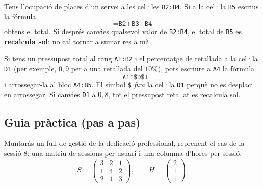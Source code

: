 \begin{exemple}
Tens l'ocupació de places d'un servei a les cel·les \texttt{B2:B4}. Si a la cel·la
\texttt{B5} escrius la fórmula
\[
\texttt{=B2+B3+B4}
\]
obtens el total. Si després canvies qualsevol valor de \texttt{B2:B4}, el total de
\texttt{B5} es \textbf{recalcula sol}: no cal tornar a sumar res a mà.
\end{exemple}

\begin{exemple}
Si tens un pressupost total al rang \texttt{A1:B2} i el percentatge de retallada a
la cel·la \texttt{D1} (per exemple, $0{,}9$ per a una retallada del $10\%$), pots
escriure a \texttt{A4} la fórmula
\[
\texttt{=A1*\$D\$1}
\]
i arrossegar-la al bloc \texttt{A4:B5}. El símbol \texttt{\$} \emph{fixa} la cel·la
\texttt{D1} perquè no es desplaci en arrossegar. Si canvies \texttt{D1} a $0{,}8$,
tot el pressupost retallat es recalcula sol.
\end{exemple}

\subsection{Guia pràctica (pas a pas)}

Muntaràs un full de gestió de la dedicació professional, reprenent el cas de la
sessió 8: una matriu de sessions per usuari i una columna d'hores per sessió.
\[
S=\begin{pmatrix} 3 & 2 & 1 \\ 1 & 4 & 2 \\ 2 & 1 & 3 \end{pmatrix},\qquad
H=\begin{pmatrix} 2 \\ 1 \\ 1 \end{pmatrix}.
\]

